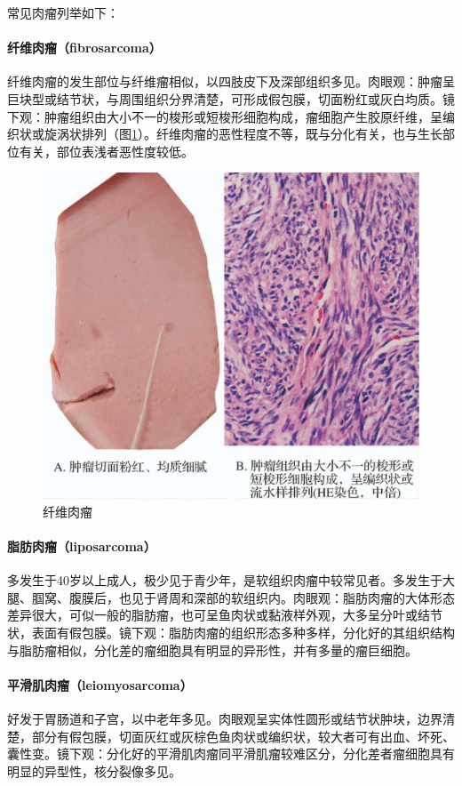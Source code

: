 常见肉瘤列举如下：

\paragraph{纤维肉瘤（fibrosarcoma）}
纤维肉瘤的发生部位与纤维瘤相似，以四肢皮下及深部组织多见。肉眼观：肿瘤呈巨块型或结节状，与周围组织分界清楚，可形成假包膜，切面粉红或灰白均质。镜下观：肿瘤组织由大小不一的梭形或短梭形细胞构成，瘤细胞产生胶原纤维，呈编织状或旋涡状排列（图\ref{fig5-16}）。纤维肉瘤的恶性程度不等，既与分化有关，也与生长部位有关，部位表浅者恶性度较低。

\begin{figure}[!htbp]
  \centering
  \includegraphics{./images/Image00085.jpg}
  \caption{纤维肉瘤}
  \label{fig5-16}
\end{figure}

\paragraph{脂肪肉瘤（liposarcoma）}
多发生于40岁以上成人，极少见于青少年，是软组织肉瘤中较常见者。多发生于大腿、腘窝、腹膜后，也见于肾周和深部的软组织内。肉眼观：脂肪肉瘤的大体形态差异很大，可似一般的脂肪瘤，也可呈鱼肉状或黏液样外观，大多呈分叶或结节状，表面有假包膜。镜下观：脂肪肉瘤的组织形态多种多样，分化好的其组织结构与脂肪瘤相似，分化差的瘤细胞具有明显的异形性，并有多量的瘤巨细胞。

\paragraph{平滑肌肉瘤（leiomyosarcoma）}
好发于胃肠道和子宫，以中老年多见。肉眼观呈实体性圆形或结节状肿块，边界清楚，部分有假包膜，切面灰红或灰棕色鱼肉状或编织状，较大者可有出血、坏死、囊性变。镜下观：分化好的平滑肌肉瘤同平滑肌瘤较难区分，分化差者瘤细胞具有明显的异型性，核分裂像多见。

